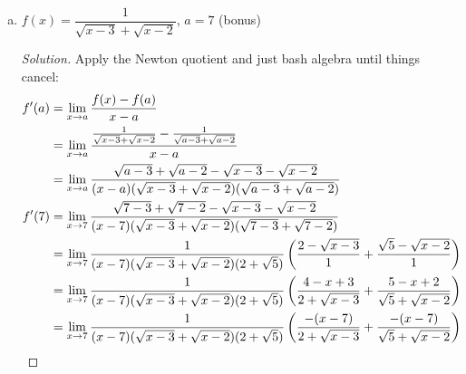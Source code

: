 \begin{enumerate}[(a)]
\begin{proof}[Solution]
\begin{align*}
                   & = \lim_{x\to-3}\frac{\frac{3}{x^2+7}-\frac{3}{(-3)^2+7}}{x+3} \\
                   & = \lim_{x\to-3}\frac{27+7-3x^2-7}{16(x+3)(x^2+7)}             \\
                   & = -\frac{3}{16}\lim_{x\to-3}\frac{x^2-9}{(x+3)(x^2+7)}        \\
                   & = -\frac{3}{16}\lim_{x\to-3}\frac{(x-3)(x+3)}{(x+3)(x^2+7)}   \\
                   & = -\frac{3}{16}\lim_{x\to-3}\frac{x-3}{x^2+7}                 \\
                   & = \frac{9}{128} \qedhere
          \end{align*}
        \end{proof}
  \item $f(x) = \dfrac{1}{\sqrt{x-3}+\sqrt{x-2}}$, $a=7$ (bonus)
        \begin{proof}[Solution]
          Apply the Newton quotient and just bash algebra until things cancel:
          \begin{align*}
            f'(a) & = \dlim{x}{a}\frac{f(x)-f(a)}{x-a}                                                                                   \\
                  & = \dlim{x}{a}\frac{\frac{1}{\sqrt{x-3}+\sqrt{x-2}}-\frac{1}{\sqrt{a-3}+\sqrt{a-2}}}{x-a}                             \\
                  & = \dlim{x}{a}\frac{\sqrt{a-3}+\sqrt{a-2}-\sqrt{x-3}-\sqrt{x-2}}{(x-a)(\sqrt{x-3}+\sqrt{x-2})(\sqrt{a-3}+\sqrt{a-2})} \\
            f'(7) & = \dlim{x}{7}\frac{\sqrt{7-3}+\sqrt{7-2}-\sqrt{x-3}-\sqrt{x-2}}{(x-7)(\sqrt{x-3}+\sqrt{x-2})(\sqrt{7-3}+\sqrt{7-2})} \\
                  & = \dlim{x}{7}\frac{1}{(x-7)(\sqrt{x-3}+\sqrt{x-2})(2+\sqrt{5})}
            \left( \frac{2-\sqrt{x-3}}{1} + \frac{\sqrt{5}-\sqrt{x-2}}{1} \right)                                                        \\
                  & = \dlim{x}{7}\frac{1}{(x-7)(\sqrt{x-3}+\sqrt{x-2})(2+\sqrt{5})}
            \left( \frac{4-x+3}{2+\sqrt{x-3}} + \frac{5-x+2}{\sqrt{5}+\sqrt{x-2}} \right)                                                \\
                  & = \dlim{x}{7}\frac{1}{(x-7)(\sqrt{x-3}+\sqrt{x-2})(2+\sqrt{5})}
            \left( \frac{-(x-7)}{2+\sqrt{x-3}} + \frac{-(x-7)}{\sqrt{5}+\sqrt{x-2}} \right)                                              \\

\end{align*}
\end{proof}
\end{enumerate}
